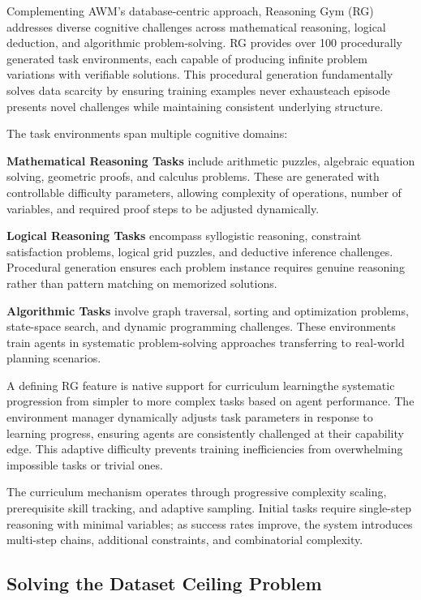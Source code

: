 Complementing AWM's database-centric approach, Reasoning Gym (RG) addresses diverse cognitive challenges across mathematical reasoning, logical deduction, and algorithmic problem-solving. RG provides over 100 procedurally generated task environments, each capable of producing infinite problem variations with verifiable solutions. This procedural generation fundamentally solves data scarcity by ensuring training examples never exhausteach episode presents novel challenges while maintaining consistent underlying structure.

The task environments span multiple cognitive domains:

\textbf{Mathematical Reasoning Tasks} include arithmetic puzzles, algebraic equation solving, geometric proofs, and calculus problems. These are generated with controllable difficulty parameters, allowing complexity of operations, number of variables, and required proof steps to be adjusted dynamically.

\textbf{Logical Reasoning Tasks} encompass syllogistic reasoning, constraint satisfaction problems, logical grid puzzles, and deductive inference challenges. Procedural generation ensures each problem instance requires genuine reasoning rather than pattern matching on memorized solutions.

\textbf{Algorithmic Tasks} involve graph traversal, sorting and optimization problems, state-space search, and dynamic programming challenges. These environments train agents in systematic problem-solving approaches transferring to real-world planning scenarios.

A defining RG feature is native support for curriculum learningthe systematic progression from simpler to more complex tasks based on agent performance. The environment manager dynamically adjusts task parameters in response to learning progress, ensuring agents are consistently challenged at their capability edge. This adaptive difficulty prevents training inefficiencies from overwhelming impossible tasks or trivial ones.

The curriculum mechanism operates through progressive complexity scaling, prerequisite skill tracking, and adaptive sampling. Initial tasks require single-step reasoning with minimal variables; as success rates improve, the system introduces multi-step chains, additional constraints, and combinatorial complexity.

\subsection{Solving the Dataset Ceiling Problem}

